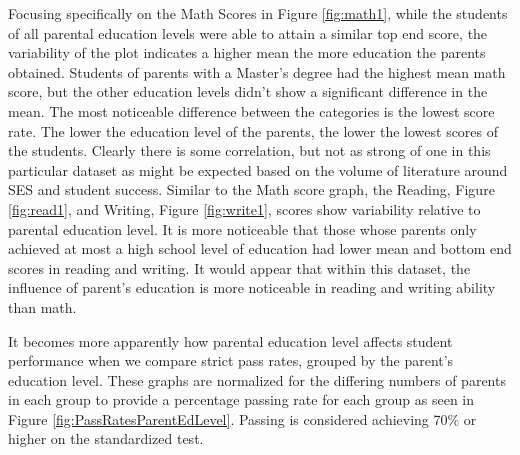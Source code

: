 \documentclass[man,floatsintext]{apa6} %
\begin{document}
Focusing specifically on the Math Scores in Figure \ref{fig:math1}, while the students of all parental education levels were able to attain a similar top end score, the variability of the plot indicates a higher mean the more education the parents obtained.  Students of parents with a Master's degree had the highest mean math score, but the other education levels didn't show a significant difference in the mean.  The most noticeable difference between the categories is the lowest score rate. The lower the education level of the parents, the lower the lowest scores of the students.  Clearly there is some correlation, but not as strong of one in this particular dataset as might be expected based on the volume of literature around SES and student success.
Similar to the Math score graph, the Reading, Figure \ref{fig:read1}, and Writing, Figure \ref{fig:write1}, scores show variability relative to parental education level.  It is more noticeable that those whose parents only achieved at most a high school level of education had lower mean and bottom end scores in reading and writing. It would appear that within this dataset, the influence of parent's education is more noticeable in reading and writing ability than math.

It becomes more apparently how parental education level affects student performance when we compare strict pass rates, grouped by the parent's education level. These graphs are normalized for the differing numbers of parents in each group to provide a percentage passing rate for each group as seen in Figure \ref{fig:PassRatesParentEdLevel}.  Passing is considered achieving 70\% or higher on the standardized test.
\end{document}

